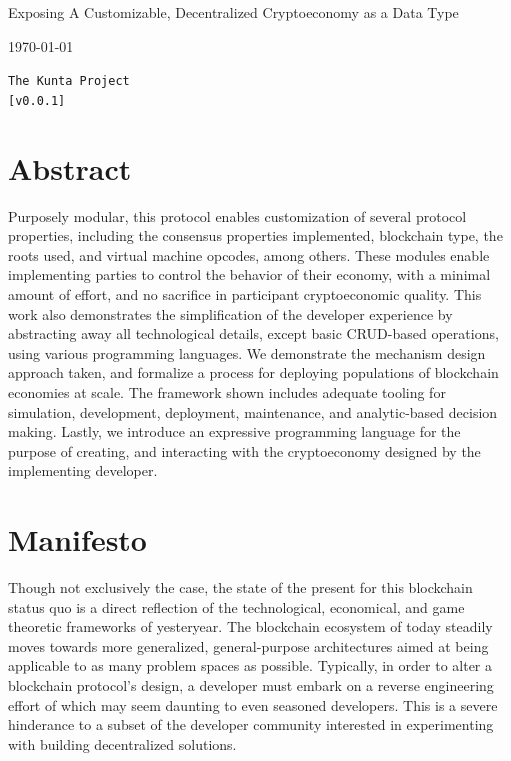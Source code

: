 \documentclass[12pt, titlepage, twocolumn]{report}
\date{\today}
\date{}
\begin{document}
\begin{titlepage}

\protect\parbox{.9\textwidth}
	{\protect\centering 
		\huge Exposing A Customizable, Decentralized Cryptoeconomy as a Data Type 
	}
\begin{center}
{\LARGE
\today}
\end{center}

\vfill
{
\Large
\begin{center}
\texttt{The Kunta Project} \\
\texttt{[v0.0.1]}
\end{center}
}
 



\vfill
\section*{Abstract}
\noindent

Purposely modular, this protocol enables customization of several protocol properties, including the consensus properties implemented, blockchain type, the roots used, and virtual machine opcodes, among others. These modules enable implementing parties to control the behavior of their economy, with a minimal amount of effort, and no sacrifice in participant cryptoeconomic quality. This work also demonstrates the simplification of the developer experience by abstracting away all technological details, except basic CRUD-based operations, using various programming languages. We demonstrate the mechanism design approach taken, and formalize a process for deploying populations of blockchain economies at scale. The framework shown includes adequate tooling for simulation, development, deployment, maintenance, and analytic-based decision making. Lastly, we introduce an expressive programming language for the purpose of creating, and interacting with the cryptoeconomy designed by the implementing developer.

\end{titlepage}


\tableofcontents
\listoffigures

\renewcommand\listoflistingscaption{List of Code Snippets}
\listoflistings

\clearpage


\onecolumn
\section{Manifesto}

Though not exclusively the case, the state of the present for this blockchain status quo is a direct reflection of the technological, economical, and game theoretic frameworks of yesteryear. The blockchain ecosystem of today steadily moves towards more generalized, general-purpose architectures aimed at being applicable to as many problem spaces as possible. Typically, in order to alter a blockchain protocol's design, a developer must embark on a reverse engineering effort of which may seem daunting to even seasoned developers. This is a severe hinderance to a subset of the developer community interested in experimenting with building decentralized solutions.
\end{document}

